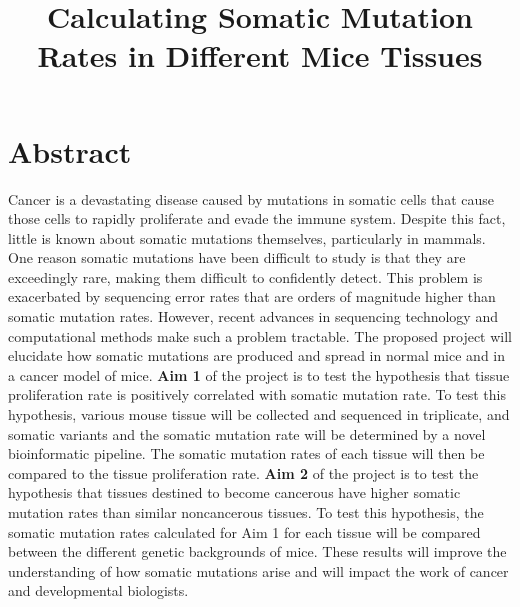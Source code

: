 \documentclass[12pt]{article}
\title{Calculating Somatic Mutation Rates in Different Mice Tissues}
\date{}
\begin{document}
\maketitle





\section{Abstract}

Cancer is a devastating disease caused by mutations in somatic cells that cause those cells to rapidly proliferate and evade the immune system.
Despite this fact, little is known about somatic mutations themselves, particularly in mammals.
One reason somatic mutations have been difficult to study is that they are exceedingly rare, making them difficult to confidently detect.
This problem is exacerbated by sequencing error rates that are orders of magnitude higher than somatic mutation rates.
However, recent advances in sequencing technology and computational methods make such a problem tractable.
The proposed project will elucidate how somatic mutations are produced and spread in normal mice and in a cancer model of mice.
\textbf{Aim 1} of the project is to test the hypothesis that tissue proliferation rate is positively correlated with somatic mutation rate.
To test this hypothesis, various mouse tissue will be collected and sequenced in triplicate, and somatic variants and the somatic mutation rate will be determined by a novel bioinformatic pipeline.
The somatic mutation rates of each tissue will then be compared to the tissue proliferation rate.
\textbf{Aim 2} of the project is to test the hypothesis that tissues destined to become cancerous have higher somatic mutation rates than similar noncancerous tissues.
To test this hypothesis, the somatic mutation rates calculated for Aim 1 for each tissue will be compared between the different genetic backgrounds of mice.
These results will improve the understanding of how somatic mutations arise and will impact the work of cancer and developmental biologists.
\end{document}
